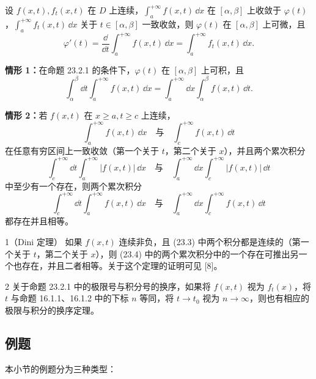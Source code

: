 \begin{xproposition}[23.2.2（可微性）]
设 $f(x,t),f_t(x,t)$ 在 $D$ 上连续，$\displaystyle\int_a^{+\infty}f(x,t)\,\dd x$ 在 $[\alpha,\beta]$ 上收敛于 $\varphi(t)$，$\displaystyle\int_a^{+\infty}f_t(x,t)\,\dd x$ 关于 $t\in[\alpha,\beta]$ 一致收敛，则 $\varphi(t)$ 在 $[\alpha,\beta]$ 上可微，且
\[
  \varphi'(t)=\frac{\dd}{\dd t}\int_a^{+\infty}f(x,t)\,\dd x=\int_a^{+\infty}f_t(x,t)\,\dd x.
\]
\end{xproposition}

\begin{xproposition}[23.2.3（交换积分次序）]
\textbf{情形 1：}在命题 23.2.1 的条件下，$\varphi(t)$ 在 $[\alpha,\beta]$ 上可积，且
\[
  \int_\alpha^\beta\dd t\int_a^{+\infty}f(x,t)\,\dd x
  =\int_a^{+\infty}\dd x\int_\alpha^\beta f(x,t)\,\dd t.
\]

\textbf{情形 2：}若 $f(x,t)$ 在 $x\geqslant a,t\geqslant c$ 上连续，
\begin{equation}
  \int_a^{+\infty}f(x,t)\,\dd x\quad\text{与}\quad\int_c^{+\infty}f(x,t)\,\dd t
  \tag{23.3}
\end{equation}
在任意有穷区间上一致收敛（第一个关于 $t$，第二个关于 $x$），并且两个累次积分
\begin{equation}
  \int_c^{+\infty}\dd t\int_a^{+\infty}|f(x,t)|\,\dd x
  \quad\text{与}\quad
  \int_a^{+\infty}\dd x\int_c^{+\infty}|f(x,t)|\,\dd t
  \tag{23.4}
\end{equation}
中至少有一个存在，则两个累次积分
\[
  \int_c^{+\infty}\dd t\int_a^{+\infty}f(x,t)\,\dd x
  \quad\text{与}\quad
  \int_a^{+\infty}\dd x\int_c^{+\infty}f(x,t)\,\dd t
\]
都存在并且相等。
\end{xproposition}

\begin{xremark}
1（Dini 定理） 如果 $f(x,t)$ 连续非负，且 (23.3) 中两个积分都是连续的（第一个关于 $t$，第二个关于 $x$），则 (23.4) 中的两个累次积分中的一个存在可推出另一个也存在，并且二者相等。关于这个定理的证明可见 [8]。
\end{xremark}

\begin{xremark}
2 关于命题 23.2.1 中的极限号与积分号的换序，如果将 $f(x,t)$ 视为 $f_t(x)$，将 $t$ 与命题 16.1.1、16.1.2 中的下标 $n$ 等同，将 $t\to t_0$ 视为 $n\to\infty$，则也有相应的极限与积分的换序定理。
\end{xremark}

\subsection{例题}
本小节的例题分为三种类型：

